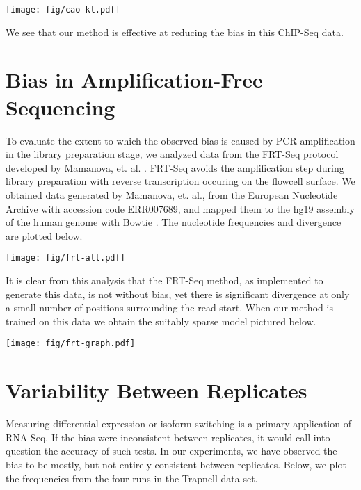\documentclass[letterpaper]{article}
\begin{document}
\begin{center}
\texttt{[image: fig/cao-kl.pdf]}
\end{center}

We see that our method is effective at reducing the bias in this ChIP-Seq data.



\section{Bias in Amplification-Free Sequencing}

To evaluate the extent to which the observed bias is caused by PCR amplification
in the library preparation stage, we analyzed data from the FRT-Seq protocol
developed by Mamanova, et. al. \cite{Mamanova2010}. FRT-Seq avoids the
amplification step during library preparation with reverse transcription
occuring on the flowcell surface. We obtained data generated by Mamanova, et.
al., from the European Nucleotide Archive with accession code ERR007689, and
mapped them to the hg19 assembly of the human genome with Bowtie
\cite{Langmead2009}. The nucleotide frequencies and divergence are plotted
below.

\begin{center}
\texttt{[image: fig/frt-all.pdf]}
\end{center}

It is clear from this analysis that the FRT-Seq method, as implemented to
generate this data, is not without bias, yet there is significant divergence at
only a small number of positions surrounding the read start. When our method is
trained on this data we obtain the suitably sparse model pictured below.

\begin{center}
\texttt{[image: fig/frt-graph.pdf]}
\end{center}



\section{Variability Between Replicates}

Measuring differential expression or isoform switching is a primary application of
RNA-Seq. If the bias were inconsistent between replicates, it would call into
question the accuracy of such tests. In our experiments, we have observed the
bias to be mostly, but not entirely consistent between replicates. Below, we
plot the frequencies from the four runs in the Trapnell data set.
\end{document}
